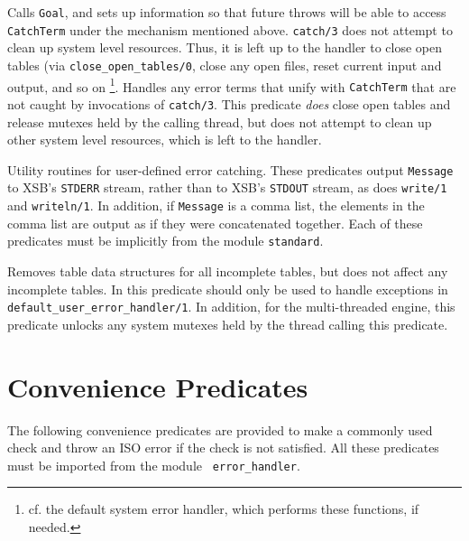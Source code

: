 \begin{description}
%
Calls {\tt Goal}, and sets up information so that future throws will
be able to access {\tt CatchTerm} under the mechanism mentioned
above. {\tt catch/3} does not attempt to clean up system level
resources.  Thus, it is left up to the handler to close open tables
(via {\tt close\_open\_tables/0}, close any open files, reset current
input and output, and so on \footnote{cf. the default system error
  handler, which performs these functions, if needed.}.
%
%
Handles any error terms that unify with {\tt CatchTerm} that are not
caught by invocations of {\tt catch/3}.  This predicate {\em does}
close open tables and release mutexes held by the calling thread, but
does not attempt to clean up other system level resources, which is
left to the handler.
%


Utility routines for user-defined error catching.  These predicates
output {\tt Message} to XSB's {\tt STDERR} stream, rather than to
XSB's {\tt STDOUT} stream, as does {\tt write/1} and {\tt writeln/1}.
In addition, if {\tt Message} is a comma list, the elements in the
comma list are output as if they were concatenated together.  Each of
these predicates must be implicitly from the module {\tt standard}.

%
Removes table data structures for all incomplete tables, but does not
affect any incomplete tables.  In \version{} this predicate should
only be used to handle exceptions in {\tt
  default\_user\_error\_handler/1}.  In addition, for the
multi-threaded engine, this predicate unlocks any system mutexes held
by the thread calling this predicate.

\end{description}

\section{Convenience Predicates}

The following convenience predicates are provided to make a commonly
used check and throw an ISO error if the check is not satisfied.  All
these predicates must be imported from the module {\tt
  error\_handler}.

